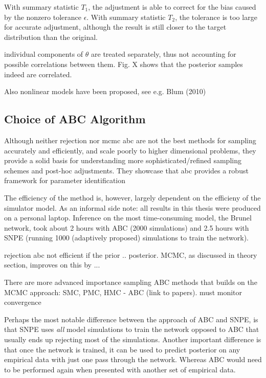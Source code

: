 With summary statistic $T_1$, the adjustment is able to correct for the bias caused by the nonzero tolerance $\epsilon$. With summary statistic $T_2$, the tolerance is too large for accurate adjustment, although the result is still closer to the target distribution than the original.

individual components of $\theta$ are treated separately, thus not accounting for possible correlations between them. Fig. X shows that the posterior samples indeed are correlated.

Also nonlinear models have been proposed, see e.g. Blum (2010)

\subsection{Choice of ABC Algorithm}

Although neither rejection nor mcmc abc are not the best methods for sampling accurately and efficiently, and scale poorly to higher dimensional problems, they provide a solid basis for understanding more sophisticated/refined sampling schemes and post-hoc adjustments. They showcase that abc provides a robust framework for parameter identification


The efficiency of the method is, however, largely dependent on the efficieny of the simulator model. As an informal side note: all results in this thesis were produced on a personal laptop. Inference on the most time-consuming model, the Brunel network, took about 2 hours with ABC (2000 simulations) and 2.5 hours with SNPE (running 1000 (adaptively proposed) simulations to train the network). 

rejection abc not efficient if the prior .. posterior. MCMC, as discussed in theory section, improves on this by ... 

There are more advanced importance sampling ABC methods that builds on the MCMC approach: SMC, PMC, HMC - ABC (link to papers). must monitor convergence

Perhaps the most notable difference between the approach of ABC and SNPE, is that SNPE uses \textit{all} model simulations to train the network opposed to ABC that usually ends up rejecting most of the simulations. Another important difference is that once the network is trained, it can be used to predict posterior on any empirical data with just one pass through the network. Whereas ABC would need to be performed again when presented with another set of empirical data. 


